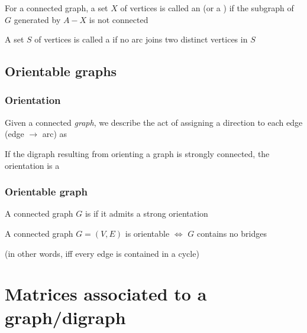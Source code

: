\documentclass[aspectratio=43]{beamer}
\begin{document}
\begin{frame} 
	\begin{definition}
		For a connected graph, a set $X$ of vertices is called an  (or a ) if the subgraph of $G$ generated by $A-X$ is not connected
	\end{definition}
	\vfill
	\begin{definition}
		A set $S$ of vertices is called a  if no arc joins two distinct vertices in $S$
	\end{definition}
	\vfill
\end{frame}




\subsection{Orientable graphs}
\begin{frame}\frametitle{Orientation}
\begin{definition}
Given a connected \emph{graph}, we describe the act of assigning a direction to each edge (edge $\rightarrow$ arc) as 
\end{definition}
\vfill
\begin{definition}
If the digraph resulting from orienting a graph is strongly connected, the orientation is a 
\end{definition}
\end{frame}
 
 
\begin{frame}\frametitle{Orientable graph}
\begin{definition}
A connected graph $G$ is  if it admits a strong orientation
\end{definition}
\vfill
\begin{theorem}
A connected graph $G=(V,E)$ is orientable $\iff$ $G$ contains no bridges
\end{theorem}
(in other words, iff every edge is contained in a cycle)
\end{frame}
 






\section{Matrices associated to a graph/digraph}
\end{document}
